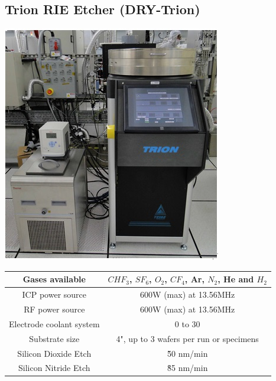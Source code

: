 \subsection{Trion RIE Etcher (DRY-Trion)}\label{nitride_etch_machine}
\WaferSemiClean

\begin{minipage}[H]{\MachinePictureWidth}
	\includegraphics[width=\MachinePictureWidth]{pictures_machines/nitride_etcher.png}
\end{minipage}\begin{minipage}[H]{0.5\textwidth}
	\begin{tabular}{|c|c|}
		\hline
		Gases available &
		$CHF_3$, $SF_6$, $O_2$, $CF_4$, Ar, $N_2$, He and $H_2$ \\
		\hline
		ICP power source &
		600W (max) at 13.56MHz \\
		\hline
		RF power source &
		600W (max) at 13.56MHz \\
		\hline
		Electrode coolant system &
		0 to 30\degreesC \\
		\hline
		Substrate size &
		4", up to 3 wafers per run or specimens \\
		\hline
		Silicon Dioxide Etch &
		\~ 50 nm/min \\
		\hline
		Silicon Nitride Etch &
		\~ 85 nm/min \\
		\hline
	\end{tabular}
\end{minipage}


